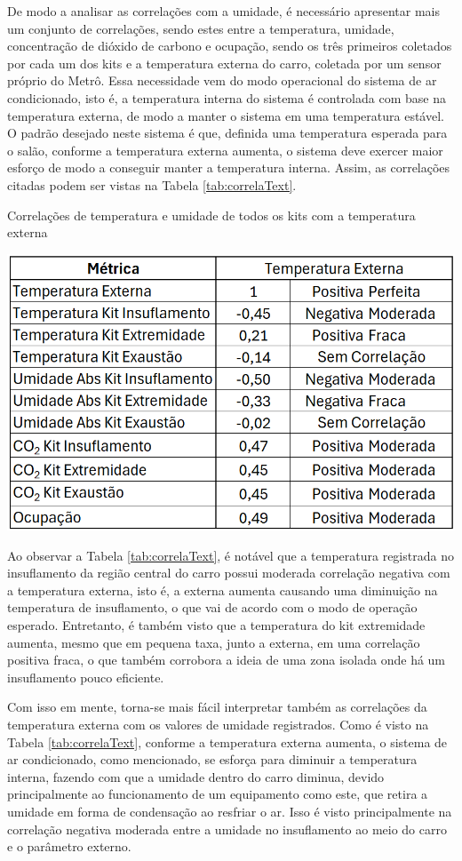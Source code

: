\documentclass[acronym,symbols,table]{fei}
\begin{document}
De modo a analisar as correlações com a umidade, é necessário apresentar mais um conjunto de correlações, sendo estes entre a temperatura, umidade, concentração de dióxido de carbono e ocupação, sendo os três primeiros coletados por cada um dos kits e a temperatura externa do carro, coletada por um sensor próprio do Metrô. Essa necessidade vem do modo operacional do sistema de ar condicionado, isto é, a temperatura interna do sistema é controlada com base na temperatura externa, de modo a manter o sistema em uma temperatura estável. O padrão desejado neste sistema é que, definida uma temperatura esperada para o salão, conforme a temperatura externa aumenta, o sistema deve exercer maior esforço de modo a conseguir manter a temperatura interna. Assim, as correlações citadas podem ser vistas na Tabela \ref{tab:correlaText}.

\begin{table}[!htb]
 \centering
    \caption{Correlações de temperatura e umidade de todos os kits com a temperatura externa}
    \includegraphics[width=0.6\linewidth]{Tabelas/correlaText2.png}
    \label{tab:correlaText}
\end{table}

Ao observar a Tabela \ref{tab:correlaText}, é notável que a temperatura registrada no insuflamento da região central do carro possui moderada correlação negativa com a temperatura externa, isto é, a externa aumenta causando uma diminuição na temperatura de insuflamento, o que vai de acordo com o modo de operação esperado. Entretanto, é também visto que a temperatura do kit extremidade aumenta, mesmo que em pequena taxa, junto a externa, em uma correlação positiva fraca, o que também corrobora a ideia de uma zona isolada onde há um insuflamento pouco eficiente. 

Com isso em mente, torna-se mais fácil interpretar também as correlações da temperatura externa com os valores de umidade registrados. Como é visto na Tabela \ref{tab:correlaText}, conforme a temperatura externa aumenta, o sistema de ar condicionado, como mencionado, se esforça para diminuir a temperatura interna, fazendo com que a umidade dentro do carro diminua, devido principalmente ao funcionamento de um equipamento como este, que retira a umidade em forma de condensação ao resfriar o ar. Isso é visto principalmente na correlação negativa moderada entre a umidade no insuflamento ao meio do carro e o parâmetro externo.
\end{document}
